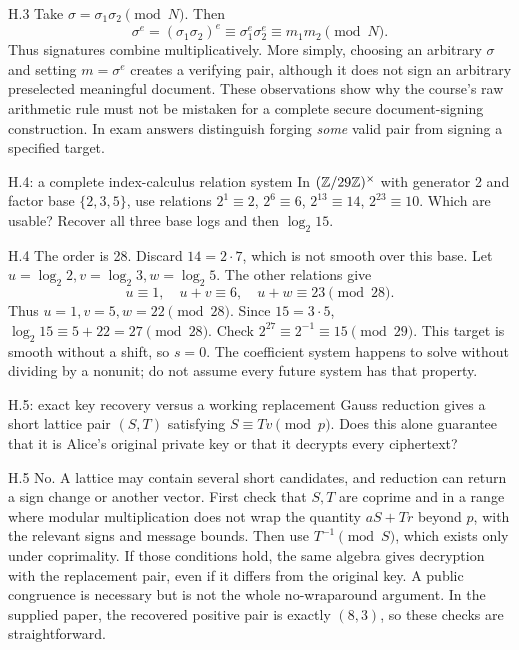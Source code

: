 \documentclass[11pt,a4paper]{article}
\begin{document}
\begin{answer}{H.3}
Take \(\sigma=\sigma_1\sigma_2\pmod N\). Then
\[\sigma^e=(\sigma_1\sigma_2)^e\equiv\sigma_1^e\sigma_2^e\equiv m_1m_2\pmod N.\]
Thus signatures combine multiplicatively. More simply, choosing an arbitrary \(\sigma\) and setting \(m=\sigma^e\) creates a verifying pair, although it does not sign an arbitrary preselected meaningful document. These observations show why the course's raw arithmetic rule must not be mistaken for a complete secure document-signing construction. In exam answers distinguish forging \emph{some} valid pair from signing a specified target.
\end{answer}
\begin{question}{H.4: a complete index-calculus relation system}
In \((\mathbb Z/29\mathbb Z)^\times\) with generator 2 and factor base \(\{2,3,5\}\), use relations \(2^1\equiv2\), \(2^6\equiv6\), \(2^{13}\equiv14\), \(2^{23}\equiv10\). Which are usable? Recover all three base logs and then \(\log_2 15\).
\end{question}
\begin{answer}{H.4}
The order is 28. Discard \(14=2\cdot7\), which is not smooth over this base. Let \(u=\log_2 2,v=\log_2 3,w=\log_2 5\). The other relations give
\[u\equiv1,\quad u+v\equiv6,\quad u+w\equiv23\pmod{28}.\]
Thus \(u=1,v=5,w=22\pmod{28}\). Since \(15=3\cdot5\), \(\log_2 15\equiv5+22=27\pmod{28}\). Check \(2^{27}\equiv2^{-1}\equiv15\pmod{29}\). This target is smooth without a shift, so \(s=0\). The coefficient system happens to solve without dividing by a nonunit; do not assume every future system has that property.
\end{answer}
\begin{question}{H.5: exact key recovery versus a working replacement}
Gauss reduction gives a short lattice pair \((S,T)\) satisfying \(S\equiv Tv\pmod p\). Does this alone guarantee that it is Alice's original private key or that it decrypts every ciphertext?
\end{question}
\begin{answer}{H.5}
No. A lattice may contain several short candidates, and reduction can return a sign change or another vector. First check that \(S,T\) are coprime and in a range where modular multiplication does not wrap the quantity \(aS+Tr\) beyond \(p\), with the relevant signs and message bounds. Then use \(T^{-1}\pmod S\), which exists only under coprimality. If those conditions hold, the same algebra gives decryption with the replacement pair, even if it differs from the original key. A public congruence is necessary but is not the whole no-wraparound argument. In the supplied paper, the recovered positive pair is exactly \((8,3)\), so these checks are straightforward.
\end{answer}
\end{document}

